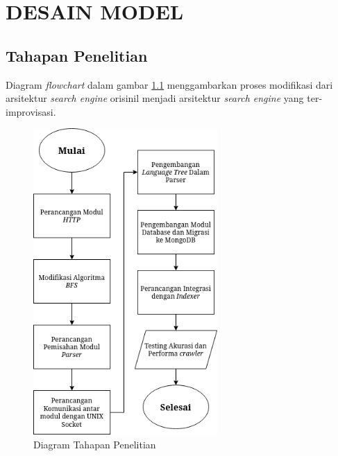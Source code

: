 
\chapter{DESAIN MODEL}

\section{Tahapan Penelitian}

Diagram \emph{flowchart} dalam gambar \ref{gambar:diagram_experiment} menggambarkan proses modifikasi dari arsitektur \emph{search engine} orisinil menjadi arsitektur \emph{search engine} yang ter-improvisasi.

\begin{figure}[H]
	\centering
	\includegraphics[keepaspectratio, width=7cm]{gambar/experiment-diagram.png}
	\caption{Diagram Tahapan Penelitian}
	\label{gambar:diagram_experiment}
\end{figure}

